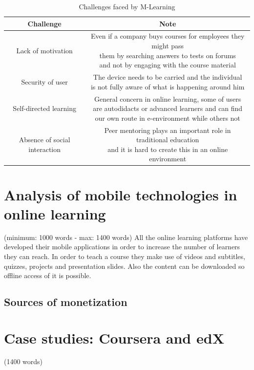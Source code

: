 \documentclass[11]{article}
\begin{document}
\begin{table}[H]
	\centering
	\caption{Challenges faced by M-Learning}
	\label{mLearChall}
	\begin{tabular}{|c|c|}
		\hline
		\textbf{ Challenge } & \textbf{Note}  \\
		\hline
		Lack of motivation & \makecell { Even if a company buys courses for employees they might pass\\ them by searching answers to tests on forums\\ and not by engaging with the course material}  \\	
		\hline
		Security of user & \makecell{The device needs to be carried and the individual\\ is not fully aware of what is happening around him}  \\	
		\hline
		Self-directed learning & \makecell{General concern in online learning, some of users\\ are autodidacts or advanced learners and can find\\ our own route in e-environment while others not}  \\	
		\hline
		Absence of social interaction & \makecell{Peer mentoring plays an important role in traditional education\\ and it is hard to create this in an online environment}\\
		\hline
	\end{tabular}
\end{table}

\newpage
\section{Analysis of mobile technologies in online learning}(minimum: 1000 words - max: 1400 words)
	All the online learning platforms have developed their mobile applications in order to increase the number of learners they can reach. In order to teach a course they make use of videos and subtitles, quizzes, projects and presentation slides. Also the content can be downloaded so offline access of it is possible. 


	\subsection{Sources of monetization}

	
\section{Case studies: Coursera and edX}(1400 words)
\end{document}
